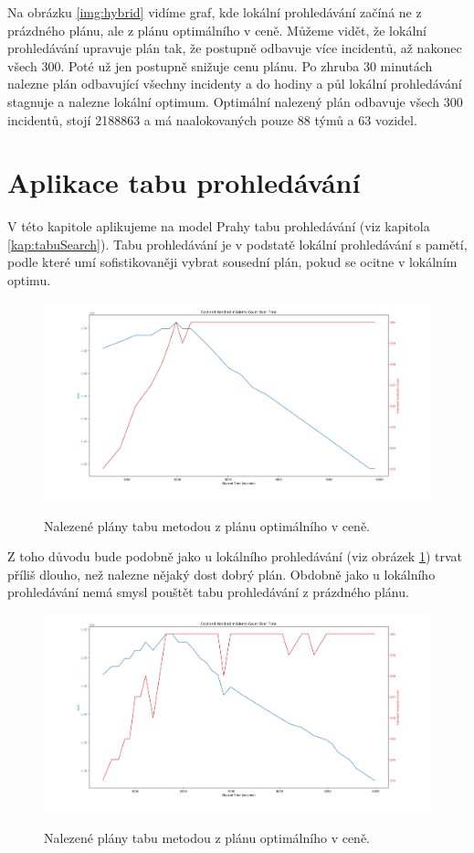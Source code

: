 Na obrázku \ref{img:hybrid} vidíme graf, kde lokální prohledávání začíná ne z prázdného plánu, ale z plánu optimálního v ceně.
Můžeme vidět, že lokální prohledávání upravuje plán tak, že postupně odbavuje více incidentů, až nakonec všech 300. Poté už jen postupně snižuje cenu plánu.
Po zhruba 30 minutách nalezne plán odbavující všechny incidenty a do hodiny a půl lokální prohledávání stagnuje a nalezne lokální optimum.
Optimální nalezený plán odbavuje všech 300 incidentů, stojí 2188863 a má naalokovaných pouze 88 týmů a 63 vozidel.

\section{Aplikace tabu prohledávání}

V této kapitole aplikujeme na model Prahy tabu prohledávání (viz kapitola \ref{kap:tabuSearch}).
Tabu prohledávání je v podstatě lokální prohledávání s pamětí, podle které umí sofistikovaněji vybrat sousední plán,
pokud se ocitne v lokálním optimu.

\begin{figure}[H]
  \caption{Nalezené plány tabu metodou z plánu optimálního v ceně.}
  \includegraphics[width=\textwidth]{img/plots/tabuSearch_empty.png}
  \centering
  \label{img:empty_tabu}
\end{figure}

Z toho důvodu bude podobně jako u lokálního prohledávání (viz obrázek \ref{img:empty_tabu}) trvat příliš dlouho, než nalezne nějaký dost dobrý plán.
Obdobně jako u lokálního prohledávání nemá smysl pouštět tabu prohledávání z prázdného plánu.

\begin{figure}[H]
  \caption{Nalezené plány tabu metodou z plánu optimálního v ceně.}
  \includegraphics[width=\textwidth]{img/plots/tabuSearch_fromOptimal.png}
  \centering
  \label{img:hybrid_tabu}
\end{figure}

